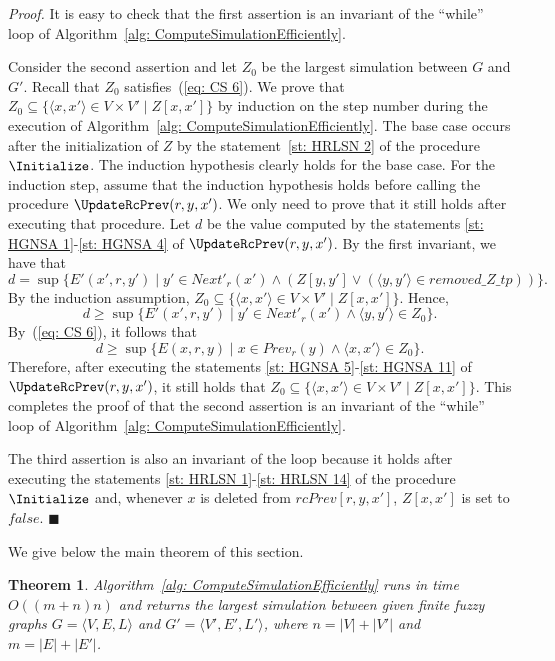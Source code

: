 \documentclass[11pt]{article}
\def\tuple#1{\langle#1\rangle}
\def\eqref#1{(\ref{#1})}
\def\false{\mathit{false}}
\newcommand{\myend}{\mbox{}\hfill{\footnotesize$\blacksquare$}}
\newcommand{\Prev}{\mathit{Prev}}
\newcommand{\NextP}{\mathit{Next}'}
\newcommand{\removeZ}{\textit{removed\_Z\_tp}}
\newcommand{\rcPrev}{\mathit{rcPrev}}
\newtheorem{theorem}{Theorem}[section]
\newenvironment{proof}{
	
	\smallskip
	
	\noindent
	{\em Proof.}}{
	
	\smallskip
	
}
\begin{document}
\begin{proof}
It is easy to check that the first assertion is an invariant of the ``while'' loop of Algorithm~\ref{alg: ComputeSimulationEfficiently}. 

Consider the second assertion and let $Z_0$ be the largest simulation between $G$ and $G'$. Recall that $Z_0$ satisfies~\eqref{eq: CS 6}. We prove that $Z_0 \subseteq \{\tuple{x,x'} \in V \times V' \mid Z[x,x']\}$ by induction on the step number during the execution of Algorithm~\ref{alg: ComputeSimulationEfficiently}. The base case occurs after the initialization of $Z$ by the statement~\ref{st: HRLSN 2} of the procedure $\Initialize$. The induction hypothesis clearly holds for the base case. For the induction step, assume that the induction hypothesis holds before calling the procedure $\UpdateRcPrev(r,y,x')$. We only need to prove that it still holds after executing that procedure. Let $d$ be the value computed by the statements \ref{st: HGNSA 1}-\ref{st: HGNSA 4} of $\UpdateRcPrev(r,y,x')$. 
%
By the first invariant, we have that 
\[
d = \sup \{E'(x',r,y') \mid y' \in \NextP_r(x') \land (Z[y,y'] \lor (\tuple{y,y'} \in \removeZ))\}.	 
\]
By the induction assumption, $Z_0 \subseteq \{\tuple{x,x'} \in V \times V' \mid Z[x,x']\}$. Hence, 
\[
d \geq \sup \{E'(x',r,y') \mid y' \in \NextP_r(x') \land \tuple{y,y'} \in Z_0\}.	 
\]
By~\eqref{eq: CS 6}, it follows that 
\[
d \geq \sup \{E(x,r,y) \mid x \in \Prev_r(y) \land \tuple{x,x'} \in Z_0\}.
\]
Therefore, after executing the statements \ref{st: HGNSA 5}-\ref{st: HGNSA 11} of $\UpdateRcPrev(r,y,x')$, it still holds that $Z_0 \subseteq \{\tuple{x,x'} \in V \times V' \mid Z[x,x']\}$. This completes the proof of that the second assertion is an invariant of the ``while'' loop of Algorithm~\ref{alg: ComputeSimulationEfficiently}. 

The third assertion is also an invariant of the loop because it holds after executing the statements \ref{st: HRLSN 1}-\ref{st: HRLSN 14} of the procedure $\Initialize$ and, whenever $x$ is deleted from $\rcPrev[r,y,x']$, $Z[x,x']$ is set to $\false$. 
\myend
\end{proof}

We give below the main theorem of this section. 

\begin{theorem}\label{theorem: JHLWA}
Algorithm~\ref{alg: ComputeSimulationEfficiently} runs in time $O((m+n)n)$ and returns the largest simulation between given finite fuzzy graphs $G = \tuple{V,E,L}$ and $G' = \tuple{V',E',L'}$, where $n = |V| + |V'|$ and $m = |E| + |E'|$. 
\end{theorem}
\end{document}
